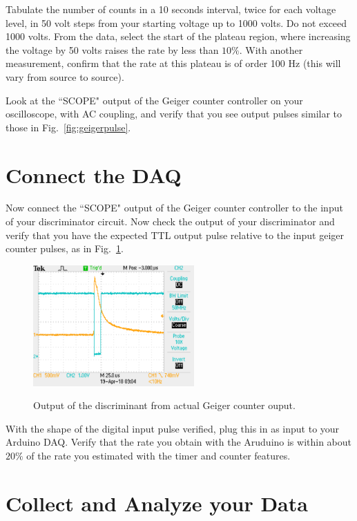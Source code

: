 \documentclass[12pt]{article}
\begin{document}
Tabulate the number of counts in a 10 seconds interval, twice for each voltage level, in 50 volt steps from your starting voltage up to 1000 volts.  Do not exceed 1000 volts.  From the data, select the start of the plateau region, where increasing the voltage by 50 volts raises the rate by less than $10\%$.  With another measurement, confirm that the rate at this plateau is of order 100 Hz (this will vary from source to source).

Look at the ``SCOPE" output of the Geiger counter controller on your oscilloscope, with AC coupling, and verify that you see output pulses similar to those in Fig.~\ref{fig:geigerpulse}.

\section{Connect the DAQ}

Now connect the ``SCOPE" output of the Geiger counter controller to the input of your discriminator circuit.  Now check the output of your discriminator and verify that you have the expected TTL output pulse relative to the input geiger counter pulses, as in Fig.~\ref{fig:expected}.
\begin{figure}[htbp]
\begin{center}
{\includegraphics[width=0.55\textwidth]{figs/real.pdf}}
\end{center}
\caption{\label{fig:expected} Output of the discriminant from actual Geiger counter ouput.}
\end{figure}
With the shape of the digital input pulse verified, plug this in as input to your Arduino DAQ.  Verify that the rate you obtain with the Aruduino is within about $20\%$ of the rate you estimated with the timer and counter features.
 
\section{Collect and Analyze your Data}
\end{document}
